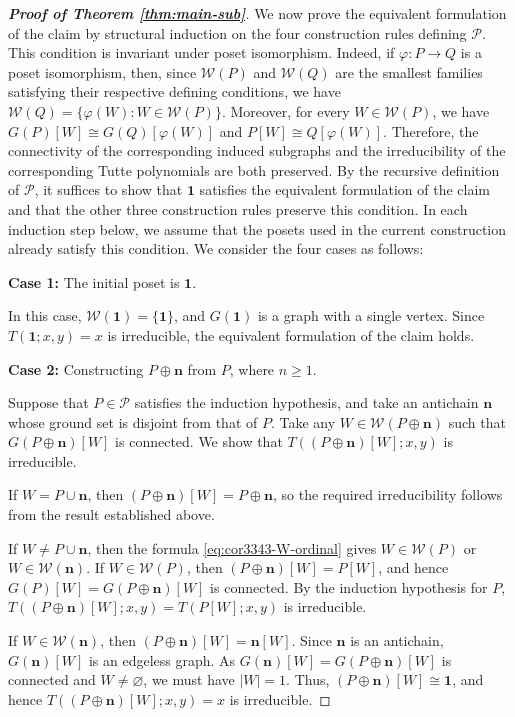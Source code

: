 \documentclass[11pt,a4paper]{article}
\begin{document}
\begin{proof}[\rm\textbf{Proof of Theorem \ref{thm:main-sub}}]
We now prove the equivalent formulation of the claim
by structural induction on the four construction rules
defining $\mathcal P$.
This condition is invariant under poset isomorphism.
Indeed, if $\varphi:P\to Q$ is a poset isomorphism,
then, since $\mathcal W(P)$ and $\mathcal W(Q)$
are the smallest families satisfying their respective
defining conditions, we have
$\mathcal W(Q)=\{\varphi(W):W\in\mathcal W(P)\}$.
Moreover, for every $W\in\mathcal W(P)$, we have
$G(P)[W]\cong G(Q)[\varphi(W)]$
and $P[W]\cong Q[\varphi(W)]$.
Therefore, the connectivity of the corresponding induced subgraphs
and the irreducibility of the corresponding Tutte polynomials
are both preserved.
By the recursive definition of $\mathcal P$,
it suffices to show that $\mathbf1$ satisfies the equivalent
formulation of the claim and that the other three construction rules
preserve this condition.
In each induction step below, we assume that the posets used
in the current construction already satisfy this condition.
We consider the four cases as follows:

\textbf{Case 1:} The initial poset is $\mathbf1$.

In this case, $\mathcal W(\mathbf1)=\{\mathbf1\}$,
and $G(\mathbf1)$ is a graph with a single vertex.
Since $T(\mathbf1;x,y)=x$ is irreducible,
the equivalent formulation of the claim holds.

\textbf{Case 2:} Constructing $P\oplus\mathbf n$ from $P$,
where $n\geq1$.

Suppose that $P\in\mathcal P$ satisfies the induction hypothesis,
and take an antichain $\mathbf n$ whose ground set is disjoint
from that of $P$.
Take any $W\in\mathcal W(P\oplus\mathbf n)$ such that
$G(P\oplus\mathbf n)[W]$ is connected.
We show that $T((P\oplus\mathbf n)[W];x,y)$ is irreducible.

If $W=P\cup\mathbf n$, then
$(P\oplus\mathbf n)[W]=P\oplus\mathbf n$,
so the required irreducibility follows
from the result established above.

If $W\neq P\cup\mathbf n$, then the formula \eqref{eq:cor3343-W-ordinal}
gives $W\in\mathcal W(P)$ or $W\in\mathcal W(\mathbf n)$.
If $W\in\mathcal W(P)$, then
$(P\oplus\mathbf n)[W]=P[W]$,
and hence $G(P)[W]=G(P\oplus\mathbf n)[W]$ is connected.
By the induction hypothesis for $P$,
$T((P\oplus\mathbf n)[W];x,y)=T(P[W];x,y)$ is irreducible.

If $W\in\mathcal W(\mathbf n)$, then
$(P\oplus\mathbf n)[W]=\mathbf n[W]$.
Since $\mathbf n$ is an antichain,
$G(\mathbf n)[W]$ is an edgeless graph.
As $G(\mathbf n)[W]=G(P\oplus\mathbf n)[W]$ is connected
and $W\neq\varnothing$, we must have $|W|=1$.
Thus, $(P\oplus\mathbf n)[W]\cong\mathbf1$, and hence
$T((P\oplus\mathbf n)[W];x,y)=x$ is irreducible.


\end{proof}
\end{document}

